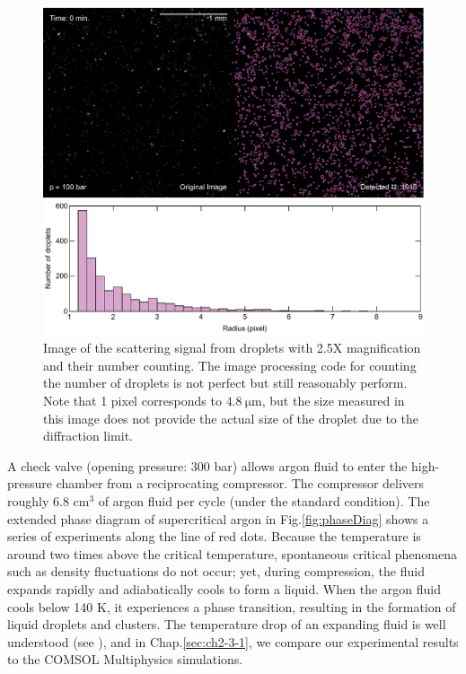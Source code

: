 \begin{figure}[t!]
\centering
\includegraphics[width=130mm]{figures/ch2/droplet/imgProcess.pdf}
\caption{Image of the scattering signal from droplets with 2.5X magnification and their number counting. The image processing code for counting the number of droplets is not perfect but still reasonably perform. Note that 1 pixel corresponds to $4.8 ~\mathrm{\mu}\text{m}$, but the size measured in this image does not provide the actual size of the droplet due to the diffraction limit.}
\label{fig:imgProcess}
\end{figure}

A check valve (opening pressure: 300 bar) allows argon fluid to enter the high-pressure chamber from a reciprocating compressor. The compressor delivers roughly $6.8\text{ cm}^3$ of argon fluid per cycle (under the standard condition). The extended phase diagram of supercritical argon in Fig.\ref{fig:phaseDiag} \cite{linstorm2020nist, banuti2017similarity} shows a series of experiments along the line of red dots. Because the temperature is around two times above the critical temperature, spontaneous critical phenomena such as density fluctuations do not occur; yet, during compression, the fluid expands rapidly and adiabatically cools to form a liquid. When the argon fluid cools below 140 K, it experiences a phase transition, resulting in the formation of liquid droplets and clusters. The temperature drop of an expanding fluid is well understood (see \cite{hagena1981nucleation, chen2009pressure, tao2016revisiting}), and in Chap.\ref{sec:ch2-3-1}, we compare our experimental results to the COMSOL Multiphysics simulations.

